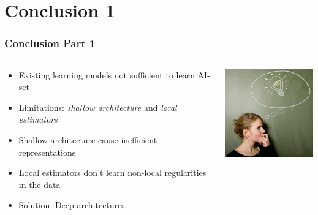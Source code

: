 \section{Conclusion 1}

\begin{frame}
	\frametitle{Conclusion Part 1}
	
	\begin{columns}
		\begin{column}{6cm}
			\begin{itemize}
				\item Existing learning models not sufficient to learn AI-set
				\item Limitations: \emph{shallow architecture} and \emph{local estimators}
				\item Shallow architecture cause inefficient representations
				\item Local estimators don't learn non-local regularities in the data
				\item Solution: Deep architectures			
			\end{itemize}
		\end{column}
		\begin{column}{5cm}
			\includegraphics[width=4.5cm]{images/bulb.jpg}
		\end{column}
	\end{columns}

\end{frame}
